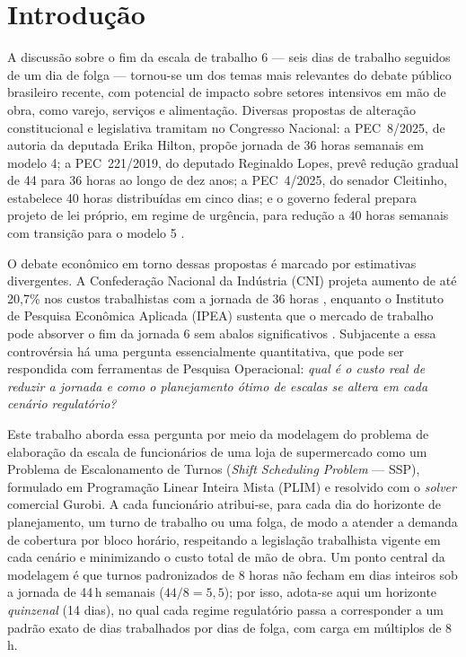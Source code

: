 \documentclass[12pt,a4paper]{article}
\begin{document}
\section{Introdução}

A discussão sobre o fim da escala de trabalho 6 --- seis dias de
trabalho seguidos de um dia de folga --- tornou-se um dos temas mais
relevantes do debate público brasileiro recente, com potencial de impacto
sobre setores intensivos em mão de obra, como varejo, serviços e alimentação.
Diversas propostas de alteração constitucional e legislativa tramitam no
Congresso Nacional: a PEC~8/2025, de autoria da deputada Erika Hilton, propõe
jornada de 36 horas semanais em modelo 4; a PEC~221/2019, do
deputado Reginaldo Lopes, prevê redução gradual de 44 para 36 horas ao longo
de dez anos; a PEC~4/2025, do senador Cleitinho, estabelece 40 horas
distribuídas em cinco dias; e o governo federal prepara projeto de lei
próprio, em regime de urgência, para redução a 40 horas semanais com
transição para o modelo 5 \cite{camara}.

O debate econômico em torno dessas propostas é marcado por estimativas
divergentes. A Confederação Nacional da Indústria (CNI) projeta aumento de
até 20,7\% nos custos trabalhistas com a jornada de 36 horas \cite{fpa},
enquanto o Instituto de Pesquisa Econômica Aplicada (IPEA) sustenta que o
mercado de trabalho pode absorver o fim da jornada 6 sem abalos
significativos \cite{ipea}. Subjacente a essa controvérsia há uma pergunta
essencialmente quantitativa, que pode ser respondida com ferramentas de
Pesquisa Operacional: \emph{qual é o custo real de reduzir a jornada e como o
planejamento ótimo de escalas se altera em cada cenário regulatório?}

Este trabalho aborda essa pergunta por meio da modelagem do problema de
elaboração da escala de funcionários de uma loja de supermercado como um
Problema de Escalonamento de Turnos (\emph{Shift Scheduling Problem} --- SSP),
formulado em Programação Linear Inteira Mista (PLIM) e resolvido com o
\emph{solver} comercial Gurobi. A cada funcionário atribui-se, para cada dia
do horizonte de planejamento, um turno de trabalho ou uma folga, de modo a
atender a demanda de cobertura por bloco horário, respeitando a legislação
trabalhista vigente em cada cenário e minimizando o custo total de mão de
obra. Um ponto central da modelagem é que turnos padronizados de 8 horas não
fecham em dias inteiros sob a jornada de 44\,h semanais ($44/8 = 5{,}5$); por
isso, adota-se aqui um horizonte \emph{quinzenal} (14 dias), no qual cada
regime regulatório passa a corresponder a um padrão exato de dias trabalhados
por dias de folga, com carga em múltiplos de 8\,h.
\end{document}
